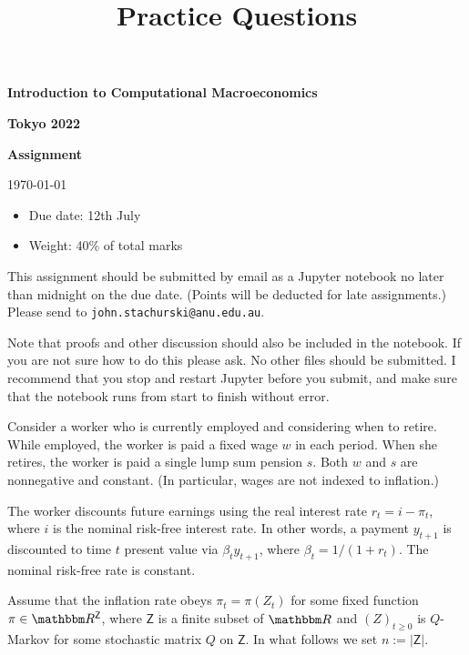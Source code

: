 \documentclass[12pt]{article}
\newcommand{\1}{\mathbbm 1}
\newcommand{\RR}{\mathbbm R}
\newcommand{\Zsf}{\mathsf Z}
\theoremstyle{definition}
\begin{document}
\title{Practice Questions}

\date{}


\begin{center}

    {\bf {\Large Introduction to Computational Macroeconomics}}

    \bigskip
    {\bf {\Large Tokyo 2022}}

    \bigskip
    {\bf {\Large Assignment}}

    \today
\end{center}

\begin{itemize}
    \item Due date: 12th July
    \item Weight: 40\% of total marks
\end{itemize}

This assignment should be submitted by email as a Jupyter notebook no later
than midnight on the due date.  (Points will be deducted for late
assignments.)  Please send to \texttt{john.stachurski@anu.edu.au}.  

Note that proofs and other discussion should also be included in the notebook.
If you are not sure how to do this please ask.  No other files should be
submitted.  I recommend that you stop and restart Jupyter before you submit,
and make sure that the notebook runs from start to finish without error.

\vspace{1em}

Consider a worker who is currently employed and considering when to retire.
While employed, the worker is paid a fixed wage $w$ in each period.  When she
retires, the worker is paid a single lump sum pension $s$.  Both $w$ and $s$
are nonnegative and constant.  (In particular, wages are not indexed to
inflation.)

The worker discounts future earnings using the real interest rate $r_t = i -
\pi_t$, where $i$ is the nominal risk-free interest rate.  In other words, a
payment $y_{t+1}$ is discounted to time $t$ present value via $\beta_t
y_{t+1}$, where $\beta_t = 1/(1 + r_t)$.  The nominal risk-free rate is
constant.

Assume that the inflation rate obeys $\pi_t = \pi(Z_t)$ for some fixed
function $\pi \in \RR^\Zsf$, where $\Zsf$ is a finite subset of $\RR$ and
$(Z)_{t \geq 0}$ is $Q$-Markov for some stochastic matrix $Q$ on $\Zsf$.
In what follows we set $n := |\Zsf|$.
\end{document}
